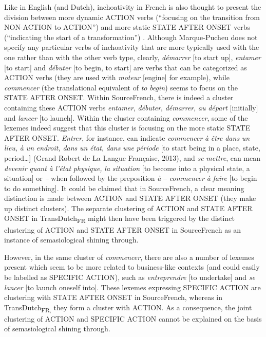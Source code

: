Like in English (and Dutch), inchoativity in French is also thought to present the division between more dynamic ACTION verbs (“focusing on the transition from NON-ACTION to ACTION”) and more static STATE AFTER ONSET verbs (“indicating the start of a transformation”) \citep[241]{vogeleer_linchoatif:_1999}. Although Marque-Pucheu does not specify any particular verbs of inchoativity that are more typically used with the one rather than with the other verb type, clearly, \textit{démarrer} [to start up], \textit{entamer} [to start] and \textit{débuter} [to begin, to start] are verbs that can be categorized as ACTION verbs (they are used with \textit{moteur} [engine] for example), while \textit{commencer} (the translational equivalent of \textit{to} \textit{begin}) seems to focus on the STATE AFTER ONSET. Within SourceFrench, there is indeed a cluster containing these ACTION verbs \textit{entamer}, \textit{débuter}, \textit{démarrer}, \textit{au} \textit{départ} [initially] and \textit{lancer} [to launch]. Within the cluster containing \textit{commencer}, some of the lexemes indeed suggest that this cluster is focusing on the more static STATE AFTER ONSET. \textit{Entrer}, for instance, can indicate \textit{commencer} \textit{à} \textit{être} \textit{dans} \textit{un} \textit{lieu,} \textit{à} \textit{un} \textit{endroit,} \textit{dans} \textit{un} \textit{état}, \textit{dans} \textit{une} \textit{période} [to start being in a place, state, period…] (Grand Robert de La Langue Française, 2013), and \textit{se} \textit{mettre}, can mean \textit{devenir} \textit{quant} \textit{à} \textit{l'état} \textit{physique,} \textit{la} \textit{situation} [to become into a physical state, a situation] or \textit{–} when followed by the preposition \textit{à} – \textit{commencer} \textit{à} \textit{faire} [to begin to do something]. It could be claimed that in SourceFrench, a clear meaning distinction is made between ACTION and STATE AFTER ONSET (they make up distinct clusters). The separate clustering of ACTION and STATE AFTER ONSET in TransDutch\textsubscript{FR} might then have been triggered by the distinct clustering of ACTION and STATE AFTER ONSET in SourceFrench as an instance of semasiological shining through.

However, in the same cluster of \textit{commencer}, there are also a number of lexemes present which seem to be more related to business-like contexts (and could easily be labelled as {SPECIFIC} ACTION), such as \textit{entreprendre} [to undertake] and \textit{se} \textit{lancer} [to launch oneself into]. These lexemes expressing {SPECIFIC} ACTION are clustering with STATE AFTER ONSET in SourceFrench, whereas in TransDutch\textsubscript{FR,} they form a cluster with ACTION. As a consequence, the joint clustering of ACTION and {SPECIFIC} ACTION cannot be explained on the basis of semasiological shining through.

